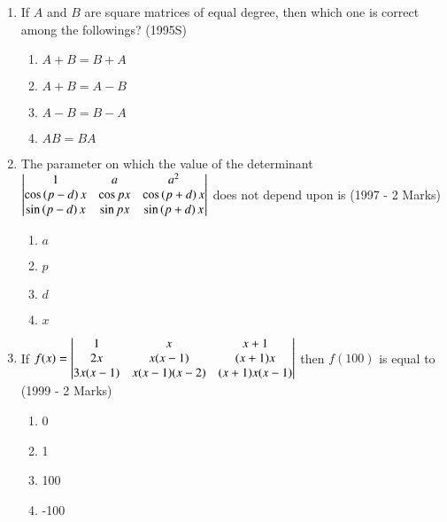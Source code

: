 \documentclass[journal]{IEEEtran}
\begin{document}
\begin{enumerate}
	\item If $A$ and $B$ are square matrices of equal degree, then which
		one is correct among the followings?
		\hfill (1995S)

		\begin{multicols}{2}
			\begin{enumerate}
				\item $A + B = B + A$
				\item $A + B = A - B$
				\columnbreak
				\item $A - B = B - A$
				\item $AB = BA$
			\end{enumerate}
		\end{multicols}

	\item The parameter on which the value of the determinant $\begin{vmatrix}
			1 & a & a^2 \\
			\cos\left(p-d\right)x & \cos px & \cos\left(p + d\right)x \\
			\sin\left(p-d\right)x & \sin px & \sin\left(p + d\right)x	
		\end{vmatrix}$ does not depend upon is
		\hfill (1997 - 2 Marks)

		\begin{multicols}{4}
			\begin{enumerate}
				\item $a$
				\item $p$
				\item $d$
				\item $x$
			\end{enumerate}
		\end{multicols}

	\item If $f(x) = \begin{vmatrix}
			1 & x & x + 1 \\
			2x & x(x - 1) & (x + 1)x \\
			3x(x - 1) & x(x - 1)(x - 2) & (x + 1)x(x - 1)
		\end{vmatrix}$ then $f(100)$ is equal to
		\hfill (1999 - 2 Marks)

		\begin{multicols}{4}
			\begin{enumerate}
				\item 0
				\item 1
				\item 100
				\item -100
			\end{enumerate}
		\end{multicols}

\end{enumerate}
\end{document}
